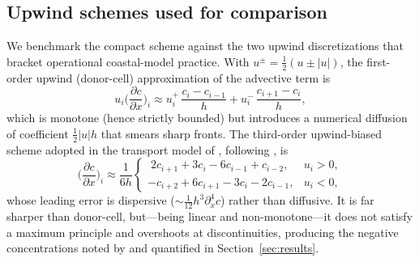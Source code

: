 \documentclass[Journal]{ascelike}   %
\begin{document}
\subsection{Upwind schemes used for comparison}
\label{sec:upwind}
We benchmark the compact scheme against the two upwind discretizations that
bracket operational coastal-model practice. With $u^{\pm}=\tfrac12(u\pm|u|)$, the
first-order upwind (donor-cell) approximation of the advective term is
\begin{equation}
u_i\Big(\frac{\partial c}{\partial x}\Big)_i \approx
u_i^{+}\,\frac{c_i-c_{i-1}}{h}+u_i^{-}\,\frac{c_{i+1}-c_i}{h},
\label{eq:up1}
\end{equation}
which is monotone (hence strictly bounded) but introduces a numerical diffusion of
coefficient $\tfrac12|u|h$ that smears sharp fronts. The third-order upwind-biased
scheme adopted in the transport model of \citet{sankaranarayanan1998}, following
\citet{kowalik1993}, is
\begin{equation}
\Big(\frac{\partial c}{\partial x}\Big)_i \approx \frac{1}{6h}
\begin{cases}
\;2c_{i+1}+3c_i-6c_{i-1}+c_{i-2}, & u_i>0,\\[4pt]
-c_{i+2}+6c_{i+1}-3c_i-2c_{i-1}, & u_i<0,
\end{cases}
\label{eq:up3}
\end{equation}
whose leading error is dispersive ($\sim\!\tfrac{1}{12}h^{3}\partial^4_x c$) rather
than diffusive. It is far sharper than donor-cell, but---being linear and
non-monotone---it does not satisfy a maximum principle and overshoots at
discontinuities, producing the negative concentrations noted by
\citet{sankaranarayanan1998} and quantified in Section~\ref{sec:results}.
\end{document}
